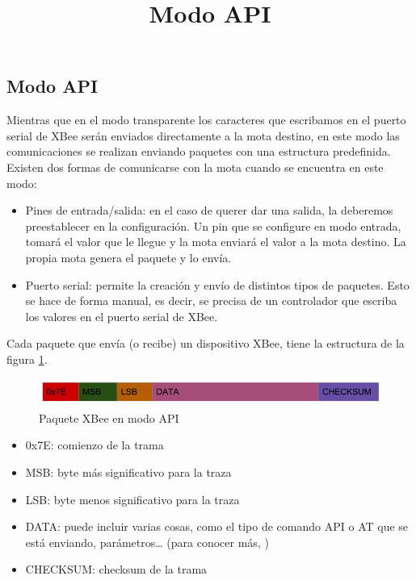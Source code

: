\subsection{Modo API}
\title{Modo API}

Mientras que en el modo transparente los caracteres que escribamos en el puerto
serial de XBee serán enviados directamente a la mota destino, en este modo las
comunicaciones se realizan enviando paquetes con una estructura predefinida.\\

Existen dos formas de comunicarse con la mota cuando se encuentra en este modo:
\begin{itemize}
  \item Pines de entrada/salida: en el caso de querer dar una salida, la deberemos preestablecer en la configuración.
  Un pin que se configure en modo entrada, tomará el valor que le llegue y la mota enviará el valor a la mota destino.
  La propia mota genera el paquete y lo envía.
  \item Puerto serial: permite la creación y envío de distintos tipos de paquetes.
  Esto se hace de forma manual, es decir, se precisa de un controlador que escriba los valores en el puerto serial de XBee.
\end{itemize}

Cada paquete que envía (o recibe) un dispositivo XBee, tiene la estructura de la figura \ref{fig:tramaapi}.

\begin{figure}[htb]
\centering
\includegraphics[width=1\textwidth]{./imagenes/tramaapi}
\caption{Paquete XBee en modo API} \label{fig:tramaapi}
\end{figure}

\begin{itemize}
  \item 0x7E: comienzo de la trama
  \item MSB: byte más significativo para la traza
  \item LSB: byte menos significativo para la traza
  \item DATA: puede incluir varias cosas, como el tipo de comando API o AT que se está enviando, parámetros… (para conocer más, )
  \item CHECKSUM: checksum de la trama
\end{itemize}

